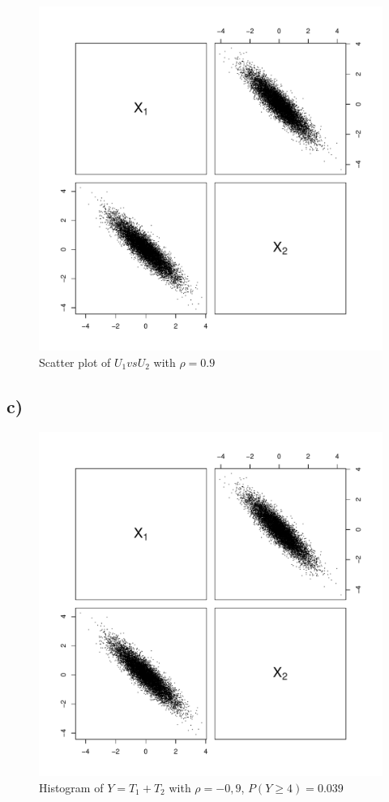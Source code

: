 \documentclass[a4paper, 11pt]{article}
\begin{document}
\begin{figure}[H]
  \centering
  \includegraphics[scale=0.5,page=6]{Rplots4.pdf}
  \caption{Scatter plot of $U_1 vs U_2$ with $\rho = 0.9$}
  \label{u1u2pos}
\end{figure}


\subsection*{c)}

\begin{figure}[H]
  \centering
  \includegraphics[scale=0.5,page=7]{Rplots4.pdf}
  \caption{Histogram of $Y=T_1 + T_2$ with $\rho = -0,9$, $P(Y\geq4) = 0.039$}
  \label{ygekroneg}
\end{figure}
\end{document}
